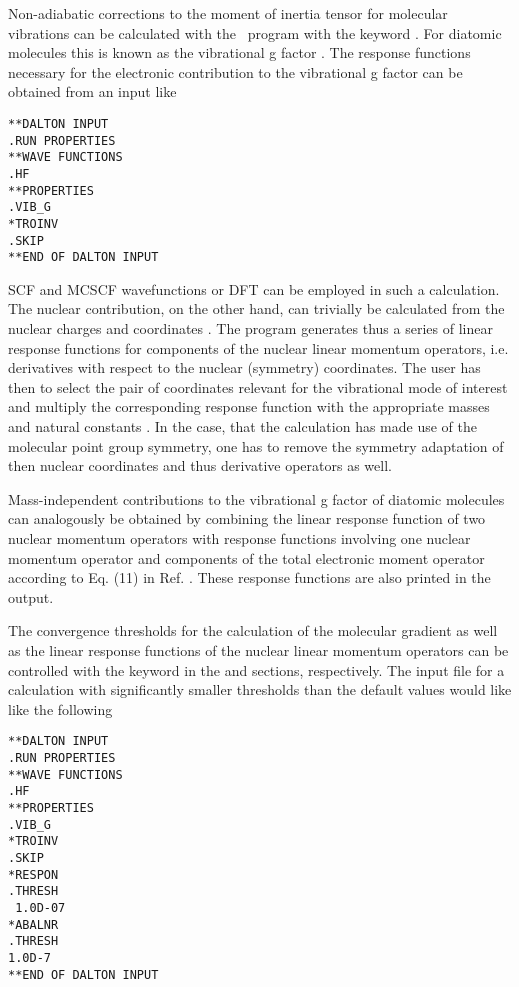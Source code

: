 Non-adiabatic corrections to the moment of inertia tensor for molecular
vibrations can be calculated with the \dalton\ program with the keyword
. For diatomic molecules this is known
as the vibrational g factor \cite{rv66ha,jfo98ho,spas063}.
 The response functions necessary for the
electronic contribution to the vibrational g factor can be obtained
from an input like


\begin{verbatim}
**DALTON INPUT
.RUN PROPERTIES
**WAVE FUNCTIONS
.HF
**PROPERTIES
.VIB_G
*TROINV
.SKIP
**END OF DALTON INPUT
\end{verbatim}

SCF and MCSCF wavefunctions or DFT can be employed in such a
calculation. The nuclear contribution, on the other hand, can trivially
be calculated from the nuclear charges and coordinates
\cite{spas063,spas084}. The program generates thus a series of linear
response functions for components of the nuclear linear momentum
operators, i.e. derivatives with respect to the nuclear (symmetry)
coordinates. The user has then to select the pair of coordinates
relevant for the vibrational mode of interest and multiply the
corresponding response function with the appropriate masses and natural
constants \cite{spas063,spas084}. In the case, that the calculation has
made use of the molecular point group symmetry, one has to remove the
symmetry adaptation of then nuclear coordinates and thus derivative
operators as well.

Mass-independent contributions to the vibrational g factor of diatomic
molecules can analogously be obtained by combining the linear response
function of two nuclear momentum operators with response functions
involving one nuclear momentum operator and components of the total
electronic moment operator according to Eq. (11) in Ref.
\cite{spas084}. These response functions are also printed in the
output.

The convergence thresholds for the calculation of the molecular gradient as
well as the linear response functions of the nuclear linear momentum operators
can be controlled with the  keyword in the  and
 sections, respectively. The input file for a calculation with
significantly smaller thresholds than the default values would like like the
following

\begin{verbatim}
**DALTON INPUT
.RUN PROPERTIES
**WAVE FUNCTIONS
.HF
**PROPERTIES
.VIB_G
*TROINV
.SKIP
*RESPON
.THRESH
 1.0D-07
*ABALNR
.THRESH
1.0D-7
**END OF DALTON INPUT
\end{verbatim}
